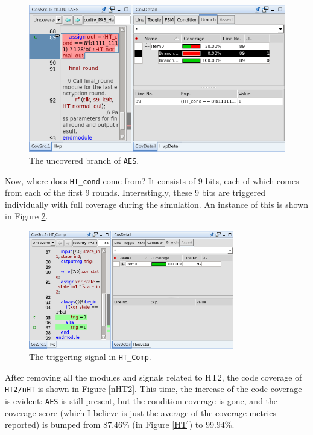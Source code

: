 \documentclass{article}
\begin{document}
\begin{figure}[h] \centering
\includegraphics[width=\textwidth]{HT2-1}
\caption{The uncovered branch of \texttt{AES}.}
\label{HT2-1}
\end{figure}

\clearpage

Now, where does \verb|HT_cond| come from? It consists of 9 bits, each of which comes from each of the first 9 rounds. Interestingly, these 9 bits are triggered individually with full coverage during the simulation. An instance of this is shown in Figure \ref{HT2-2}.

\begin{figure}[h] \centering
\includegraphics[width=0.8\textwidth]{HT2-2}
\caption{The triggering signal in \texttt{HT\_Comp}.}
\label{HT2-2}
\end{figure}

After removing all the modules and signals related to HT2, the code coverage of \verb|HT2/nHT| is shown in Figure \ref{nHT2}. This time, the increase of the code coverage is evident: \verb|AES| is still present, but the condition coverage is gone, and the coverage score (which I believe is just the average of the coverage metrics reported) is bumped from 87.46\% (in Figure \ref{HT}) to 99.94\%.
\end{document}
